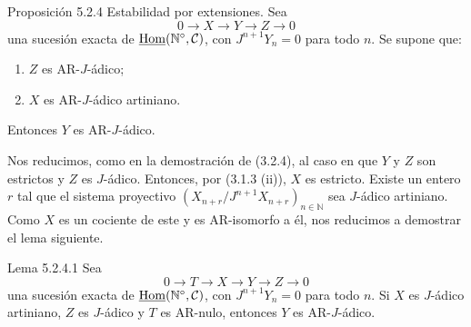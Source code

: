 \begin{statement}{Proposición 5.2.4}
Estabilidad por extensiones. Sea
\[
0\longrightarrow X\longrightarrow Y\longrightarrow Z\longrightarrow0
\]
una sucesión exacta de \(\underline{\operatorname{Hom}}(\mathbb N^\circ,\mathcal C)\), con \(J^{n+1}Y_n=0\) para todo \(n\). Se supone que:
\begin{enumerate}[label=\textup{(\roman*)}]
\item \(Z\) es AR-\(J\)-ádico;
\item \(X\) es AR-\(J\)-ádico artiniano.
\end{enumerate}
Entonces \(Y\) es AR-\(J\)-ádico.
\end{statement}

\begin{prooftext}
Nos reducimos, como en la demostración de (3.2.4), al caso en que \(Y\) y \(Z\) son estrictos y \(Z\) es \(J\)-ádico. Entonces, por (3.1.3 (ii)), \(X\) es estricto. Existe un entero \(r\) tal que el sistema proyectivo \((X_{n+r}/J^{n+1}X_{n+r})_{n\in\mathbb N}\) sea \(J\)-ádico artiniano. Como \(X\) es un cociente de este y es AR-isomorfo a él, nos reducimos a demostrar el lema siguiente.
\end{prooftext}

\begin{statement}{Lema 5.2.4.1}
Sea
\[
0\longrightarrow T\longrightarrow X\longrightarrow Y\longrightarrow Z\longrightarrow0
\]
una sucesión exacta de \(\underline{\operatorname{Hom}}(\mathbb N^\circ,\mathcal C)\), con \(J^{n+1}Y_n=0\) para todo \(n\). Si \(X\) es \(J\)-ádico artiniano, \(Z\) es \(J\)-ádico y \(T\) es AR-nulo, entonces \(Y\) es AR-\(J\)-ádico.
\end{statement}
